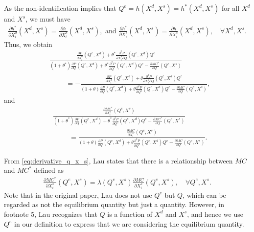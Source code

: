 \documentclass[11pt, a4paper]{article}
\theoremstyle{remark}
\begin{document}
 
As the non-identification implies that $Q^e = h(X^{d}, X^{s}) = h^{*}(X^{d}, X^{s})$ for all $X^{d}$ and $X^{s}$, we must have
\begin{align}
    \frac{\partial h^{*}}{\partial X^{d}_{i}}(X^{d}, X^{s})  = \frac{\partial h}{\partial X^{d}_{i}}(X^{d}, X^{s}), \text{  and  } \frac{\partial h^{*}}{\partial X^{s}_{i}}(X^{d}, X^{s})  = \frac{\partial h}{\partial X^{s}_{i}}(X^{d}, X^{s}), \quad \forall X^{d}, X^{s}. \label{eq:observale_equivalence_derivative}
\end{align}
Thus, we obtain 
\begin{align}
    & \frac{\frac{\partial P}{\partial X^{d}_{i}}(Q^e, X^{d}) + \theta^{*}\frac{\partial^2 P}{\partial X^{d}_{i}\partial Q}(Q^e, X^{d})Q^e }{(1+\theta^{*})\frac{\partial P}{\partial Q}(Q^e, X^{d}) + \theta^{*}\frac{\partial^2 P}{\partial Q^2}(Q^e, X^{d})Q^e - \frac{\partial MC^{*}}{\partial Q}(Q^e, X^{s})}\\
    &\hspace{1cm} = - \frac{\frac{\partial P}{\partial X^{d}_{i}}(Q^e, X^{d}) + \theta \frac{\partial^2 P}{\partial X^{d}_{i}\partial Q}(Q^e, X^{d})Q^e }{(1+\theta)\frac{\partial P}{\partial Q}(Q^e, X^{d}) + \theta\frac{\partial^2 P}{\partial Q^2}(Q^e, X^{d})Q^e - \frac{\partial MC}{\partial Q}(Q^e, X^{s})}, \label{eq:derivative_q_x_d}
\end{align}
and
\begin{align}
    &\frac{\frac{\partial MC^{*}}{\partial X^{s}_{i}}(Q^e, X^{s})}{(1+\theta^{*})\frac{\partial P}{\partial Q}(Q^e, X^{d}) + \theta^{*}\frac{\partial^2 P}{\partial Q^2}(Q^e, X^{d})Q^e - \frac{\partial MC^{*}}{\partial Q}(Q^e, X^{s})}\\ 
    &\hspace{1cm} = \frac{\frac{\partial MC}{\partial X^{s}_{i}}(Q^e, X^{s})}{(1+\theta)\frac{\partial P}{\partial Q}(Q^e, X^{d}) + \theta\frac{\partial^2 P}{\partial Q^2}(Q^e, X^{d})Q^e - \frac{\partial MC}{\partial Q}(Q^e, X^{s})}.\label{eq:derivative_q_x_s}
\end{align}


From \eqref{eq:derivative_q_x_s}, Lau states that there is a relationship between $MC$ and $MC^{*}$ defined as
\begin{align}
    \frac{\partial MC^{*}}{\partial X^{s}_{i}}(Q^e, X^{s}) = \lambda(Q^e, X^{s})\frac{\partial MC}{\partial X^{s}_{i}}(Q^e, X^{s}), \quad \forall Q^e, X^{s}. \label{eq:derivative_q_x_s_la}
\end{align}
Note that in the original paper, Lau does not use $Q^e$ but $Q$, which can be regarded as not the equilibrium quantity but just a quantity.
However, in footnote 5, Lau recognizes that $Q$ is a function of $X^{d}$ and $X^{s}$, and hence we use $Q^e$ in our definition to express that we are considering the equilibrium quantity.
\end{document}

